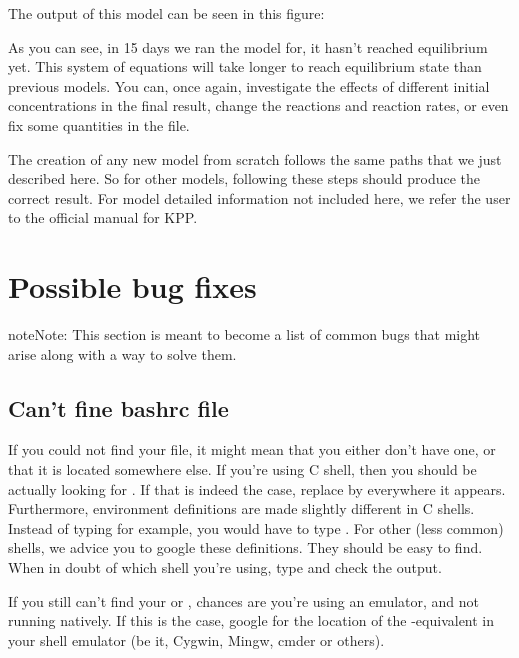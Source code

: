 \documentclass[letterpaper,10pt,openany,oneside]{sphinxmanual}
\begin{document}
The output of this model can be seen in this figure:
\label{improving:test4-time}\begin{figure}[htbp]
\centering

\noindent{}
\label{improving:test4-time}\end{figure}

As you can see, in 15 days we ran the model for, it hasn't reached equilibrium
yet. This system of equations will take longer to reach equilibrium state than
previous models. You can, once again, investigate the effects of different
initial concentrations in the final result, change the reactions and reaction
rates, or even fix some quantities in the  file.

The creation of any new model from scratch follows the same paths that we just
described here. So for other models, following these steps should produce the
correct result. For model detailed information not included here, we refer the
user to the official manual for KPP.


\chapter{Possible bug fixes}
\label{bugs:possible-bug-fixes}\label{bugs::doc}\label{bugs:bugs}
\begin{notice}{note}{Note:}
This section is meant to become a list of common bugs that might arise
along with a way to solve them.
\end{notice}


\section{Can't fine bashrc file}
\label{bugs:can-t-fine-bashrc-file}
If you could not find your  file, it might mean that you either
don't have one, or that it is located somewhere else. If you're using C shell,
then you should be actually looking for . If that is indeed the case,
replace  by  everywhere it appears. Furthermore, environment
definitions are made slightly different in C shells. Instead of typing  for example, you would have to type . For other (less common) shells, we advice you to google these
definitions. They should be easy to find.  When in doubt of which shell you're
using, type  and check the output.

If you still can't find your  or , chances are you're using
an emulator, and not running natively. If this is the case, google for the
location of the -equivalent in your shell emulator (be it, Cygwin,
Mingw, cmder or others).



\renewcommand{\indexname}{Index}
\printindex
\end{document}

